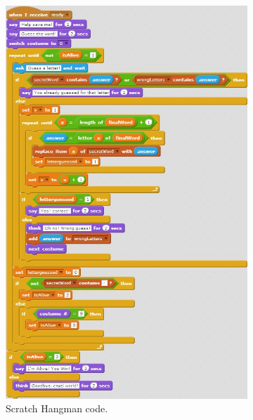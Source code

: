\begin{figure}[h]
  \centering
    \begin{subfigure}[b]{0.45\textwidth}
    \begin{center}
      \includegraphics[scale=0.5]{./pics/scratch_hang_code}
      \caption{Scratch Hangman code.}
      \label{fig:scratch_hang_code}
    \end{center}
    \end{subfigure}
    ~
    \begin{subfigure}[b]{0.45\textwidth}
    \begin{center}

\end{center}
\end{subfigure}
\end{figure}
